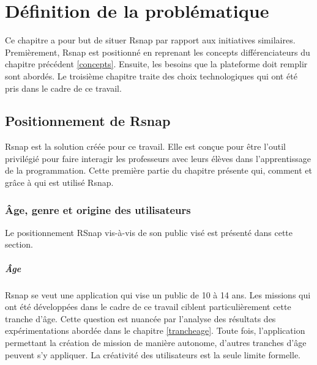 ﻿\chapter{Définition de la problématique}
Ce chapitre a pour but de situer Rsnap par rapport aux initiatives similaires. Premièrement, Rsnap est positionné en reprenant les concepts différenciateurs du chapitre précédent \ref{concepts}. Ensuite, les besoins que la plateforme doit remplir sont abordés. Le troisième chapitre traite des choix technologiques qui ont été pris dans le cadre de ce travail.

\section{Positionnement de Rsnap}
\label{positionnement}
Rsnap est la solution créée pour ce travail. Elle est conçue pour être l'outil privilégié pour faire interagir les professeurs avec leurs élèves dans l'apprentissage de la programmation.
Cette première partie du chapitre présente qui, comment et grâce à qui est utilisé Rsnap.


% 

\subsection{Âge, genre et origine des utilisateurs}
Le positionnement RSnap vis-à-vis de son public visé est présenté dans cette section.

\paragraph{Âge}
Rsnap se veut une application qui vise un public de 10 à 14 ans. Les missions qui ont été développées dans le cadre de ce travail ciblent particulièrement cette tranche d'âge. Cette question est nuancée par l'analyse des résultats des expérimentations abordée dans le chapitre \ref{trancheage}.
Toute fois, l'application permettant la création de mission de manière autonome, d'autres tranches d'âge peuvent s'y appliquer. La créativité des utilisateurs est la seule limite formelle.


